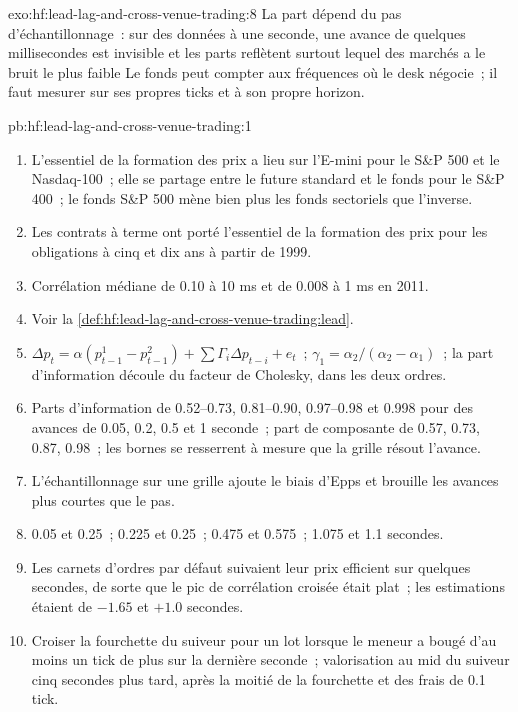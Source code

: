 \begin{solution}{exo:hf:lead-lag-and-cross-venue-trading:8}
La part dépend du pas d'échantillonnage~: sur des données à une seconde, une avance de quelques millisecondes est invisible et les parts reflètent surtout lequel des marchés a le bruit le plus faible
Le fonds peut compter aux fréquences où le desk négocie~; il faut mesurer sur ses propres ticks et à son propre horizon.
\end{solution}

\begin{solution}{pb:hf:lead-lag-and-cross-venue-trading:1}
\begin{enumerate}
\item L'essentiel de la formation des prix a lieu sur l'E-mini pour le S\&P 500 et le Nasdaq-100~; elle se partage entre le future standard et le fonds pour le S\&P 400~; le fonds S\&P 500
mène bien plus les fonds sectoriels que l'inverse.
\item Les contrats à terme ont porté l'essentiel de la formation des prix pour les obligations à cinq et dix ans à partir de 1999.
\item Corrélation médiane de 0.10 à 10 ms et de 0.008 à 1 ms en 2011.
\item Voir la \cref{def:hf:lead-lag-and-cross-venue-trading:lead}.
\item $\Delta p_t=\alpha(p^1_{t-1}-p^2_{t-1})+\sum\Gamma_i\Delta p_{t-i}+e_t$~; $\gamma_1=\alpha_2/(\alpha_2-\alpha_1)$~; la part d'information découle du
facteur de Cholesky, dans les deux ordres.
\item Parts d'information de 0.52--0.73, 0.81--0.90, 0.97--0.98 et 0.998 pour des avances de 0.05, 0.2, 0.5 et 1 seconde~; part de composante de 0.57, 0.73, 0.87,
0.98~; les bornes se resserrent à mesure que la grille résout l'avance.
\item L'échantillonnage sur une grille ajoute le biais d'Epps et brouille les avances plus courtes que le pas.
\item 0.05 et 0.25~; 0.225 et 0.25~; 0.475 et 0.575~; 1.075 et 1.1 secondes.
\item Les carnets d'ordres par défaut suivaient leur prix efficient sur quelques secondes, de sorte que le pic de corrélation croisée était plat~; les estimations étaient de $-1.65$ et $+1.0$
secondes.
\item Croiser la fourchette du suiveur pour un lot lorsque le meneur a bougé d'au moins un tick de plus sur la dernière seconde~; valorisation au mid du suiveur cinq
secondes plus tard, après la moitié de la fourchette et des frais de 0.1 tick.

\end{enumerate}
\end{solution}
